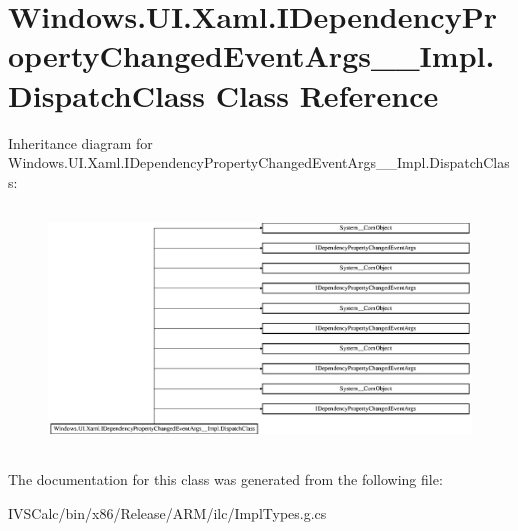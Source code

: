 \hypertarget{class_windows_1_1_u_i_1_1_xaml_1_1_i_dependency_property_changed_event_args_____impl_1_1_dispatch_class}{}\section{Windows.\+U\+I.\+Xaml.\+I\+Dependency\+Property\+Changed\+Event\+Args\+\_\+\+\_\+\+Impl.\+Dispatch\+Class Class Reference}
\label{class_windows_1_1_u_i_1_1_xaml_1_1_i_dependency_property_changed_event_args_____impl_1_1_dispatch_class}
Inheritance diagram for Windows.\+U\+I.\+Xaml.\+I\+Dependency\+Property\+Changed\+Event\+Args\+\_\+\+\_\+\+Impl.\+Dispatch\+Class\+:\begin{figure}[H]
\begin{center}
\leavevmode
\includegraphics[height=6.484210cm]{class_windows_1_1_u_i_1_1_xaml_1_1_i_dependency_property_changed_event_args_____impl_1_1_dispatch_class}
\end{center}
\end{figure}


The documentation for this class was generated from the following file\+:\begin{DoxyCompactItemize}
\item 
I\+V\+S\+Calc/bin/x86/\+Release/\+A\+R\+M/ilc/Impl\+Types.\+g.\+cs\end{DoxyCompactItemize}

